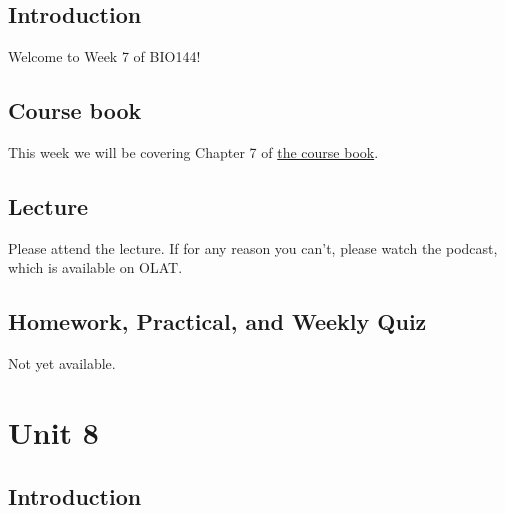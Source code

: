 \documentclass[
  letterpaper,
  8pt,
  a4paper]{book}
\begin{document}

\section*{Introduction}\label{introduction-7}


Welcome to Week 7 of BIO144!

\section*{Course book}\label{course-book-6}


This week we will be covering Chapter 7 of
\href{https://opetchey.github.io/BIO144_Course_Book/}{the course book}.

\section*{Lecture}\label{lecture-6}


Please attend the lecture. If for any reason you can't, please watch the
podcast, which is available on OLAT.

\section*{Homework, Practical, and Weekly
Quiz}\label{homework-practical-and-weekly-quiz-6}


Not yet available.


\chapter*{Unit 8}\label{unit-8}


\section*{Introduction}\label{introduction-8}
\end{document}
